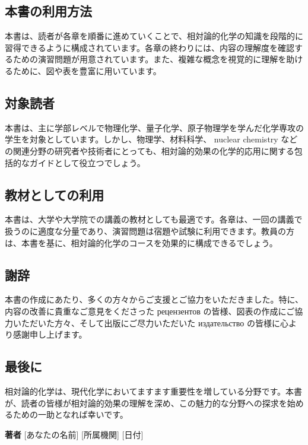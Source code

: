 \subsection{本書の利用方法}

本書は、読者が各章を順番に進めていくことで、相対論的化学の知識を段階的に習得できるように構成されています。各章の終わりには、内容の理解度を確認するための演習問題が用意されています。また、複雑な概念を視覚的に理解を助けるために、図や表を豊富に用いています。

\subsection{対象読者}

本書は、主に学部レベルで物理化学、量子化学、原子物理学を学んだ化学専攻の学生を対象としています。しかし、物理学、材料科学、 nuclear chemistry などの関連分野の研究者や技術者にとっても、相対論的効果の化学的応用に関する包括的なガイドとして役立つでしょう。

\subsection{教材としての利用}

本書は、大学や大学院での講義の教材としても最適です。各章は、一回の講義で扱うのに適度な分量であり、演習問題は宿題や試験に利用できます。教員の方は、本書を基に、相対論的化学のコースを効果的に構成できるでしょう。

\subsection{謝辞}

本書の作成にあたり、多くの方々からご支援とご協力をいただきました。特に、内容の改善に貴重なご意見をくださった рецензентов の皆様、図表の作成にご協力いただいた方々、そして出版にご尽力いただいた издательство の皆様に心より感謝申し上げます。

\subsection{最後に}

相対論的化学は、現代化学においてますます重要性を増している分野です。本書が、読者の皆様が相対論的効果の理解を深め、この魅力的な分野への探求を始めるための一助となれば幸いです。

\textbf{著者}
[あなたの名前]
[所属機関]
[日付]
